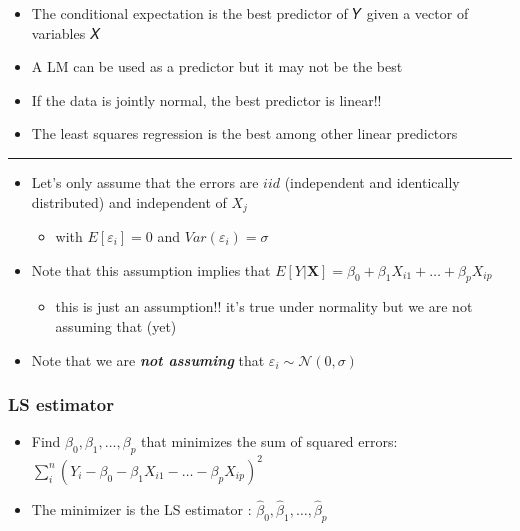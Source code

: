 \documentclass[]{article}
\providecommand{\tightlist}{%
  \setlength{\itemsep}{0pt}\setlength{\parskip}{0pt}}
\begin{document}
\begin{itemize}
\tightlist
\item
  The conditional expectation is the best predictor of 𝑌 given a vector
  of variables 𝑋
\item
  A LM can be used as a predictor but it may not be the best
\item
  If the data is jointly normal, the best predictor is linear!!
\item
  The least squares regression is the best among other linear predictors
\end{itemize}

\begin{center}\rule{0.5\linewidth}{\linethickness}\end{center}

\begin{itemize}
\tightlist
\item
  Let's only assume that the errors are \(iid\) (independent and
  identically distributed) and independent of \(X_j\)

  \begin{itemize}
  \tightlist
  \item
    with \(E[\varepsilon_i]=0\) and \(Var(\varepsilon_i)=\sigma\)\\
  \end{itemize}
\item
  Note that this assumption implies that
  \(E[Y|\mathbf{X}]=\beta_0 + \beta_1 X_{i1} + \ldots + \beta_p X_{ip}\)

  \begin{itemize}
  \tightlist
  \item
    this is just an assumption!! it's true under normality but we are
    not assuming that (yet)\\
  \end{itemize}
\item
  Note that we are \textbf{\emph{not assuming}} that
  \(\varepsilon_i \sim \mathcal{N}(0,\sigma)\)
\end{itemize}

\hypertarget{ls-estimator}{%
\subsubsection{LS estimator}\label{ls-estimator}}

\begin{itemize}
\tightlist
\item
  Find \(\beta_0, \beta_1, \ldots, \beta_p\) that minimizes the sum of
  squared errors:
  \(\sum_i^n(Y_i - \beta_0 - \beta_1 X_{i1} - \ldots - \beta_p X_{ip})^2\)\\
\item
  The minimizer is the LS estimator :
  \(\hat{\beta}_0, \hat{\beta}_1, \ldots, \hat{\beta}_p\)
\end{itemize}
\end{document}
